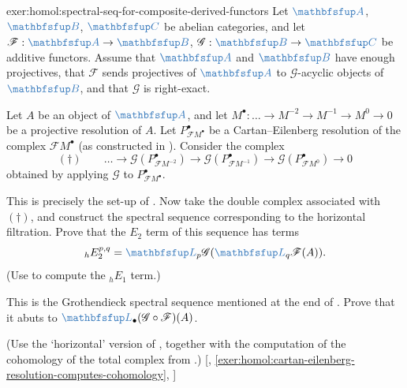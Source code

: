 \begin{exer}{\exerused{}}{exer:homol:spectral-seq-for-composite-derived-functors}
  Let $\categ{A}$, $\categ{B}$, $\categ{C}$ be abelian categories, and
  let $\mathscr{F} : \categ{A} \to \categ{B}$,
  $\mathscr{G} : \categ{B} \to \categ{C}$ be additive functors. Assume
  that $\categ{A}$ and $\categ{B}$ have enough projectives, that
  $\mathscr{F}$ sends projectives of $\categ{A}$ to
  $\mathscr{G}$-acyclic objects of $\categ{B}$, and that $\mathscr{G}$
  is right-exact.

  Let $A$ be an object of $\categ{A}$, and let
  $M^\bullet : \dots \to M^{-2} \to M^{-1} \to M^0 \to 0$ be a
  projective resolution of $A$. Let $P_{\mathscr{F}M^\bullet}^\bullet$
  be a Cartan--Eilenberg resolution of the complex
  $\mathscr{F}M^\bullet$ (as constructed in
  ). Consider the complex
  \[
    (\dagger) \qquad \dots \longrightarrow
    \mathscr{G}(P_{\mathscr{F}M^{-2}}^\bullet) \longrightarrow
    \mathscr{G}(P_{\mathscr{F}M^{-1}}^\bullet) \longrightarrow
    \mathscr{G}(P_{\mathscr{F}M^0}^\bullet) \longrightarrow 0
  \]
  obtained by applying $\mathscr{G}$ to
  $P_{\mathscr{F}M^\bullet}^\bullet$.

  This is precisely the set-up of
  . Now
  take the double complex associated with $(\dagger)$, and construct
  the spectral sequence corresponding to the horizontal
  filtration. Prove that the $E_2$ term of this sequence has terms
  \[ {}_hE_2^{p,q} =
    \categ{L}_p\mathscr{G}(\categ{L}_q\mathscr{F}(A)).
  \]
  (Use
   to
  compute the ${}_hE_1$ term.)

  This is the Grothendieck spectral sequence mentioned at the end of
  . Prove that it abuts to
  $\categ{L}_\bullet(\mathscr{G} \circ \mathscr{F})(A)$.

  (Use the `horizontal' version of , together
  with the computation of the cohomology of the total complex from
  .)
  [,
  \ref{exer:homol:cartan-eilenberg-resolution-computes-cohomology},
  ]
\end{exer}

